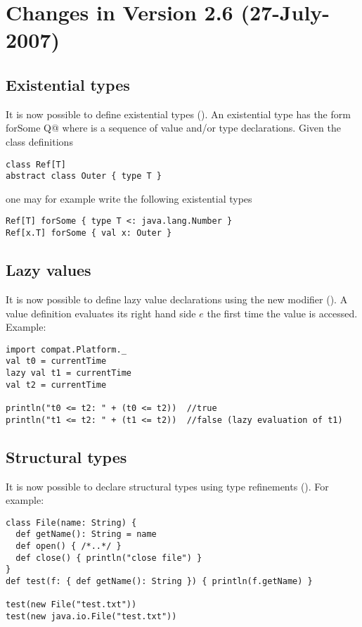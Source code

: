 \section*{Changes in Version 2.6 (27-July-2007)}

\subsection*{Existential types}

It is now possible to define existential types
().
An existential type has the form \lstinline@T forSome {Q}@ where
\lstinline@Q@ 
is a sequence of value and/or type declarations. Given the class definitions
\begin{lstlisting}
class Ref[T]
abstract class Outer { type T }
\end{lstlisting}
one may for example write the following existential types
\begin{lstlisting}
Ref[T] forSome { type T <: java.lang.Number }
Ref[x.T] forSome { val x: Outer }
\end{lstlisting}

\subsection*{Lazy values}

It is now possible to define lazy value declarations
using the new modifier \lstinline@lazy@ ().
A \lstinline@lazy@ value definition evaluates
its right hand side $e$ the first time the value is accessed.
Example:
\begin{lstlisting}
import compat.Platform._
val t0 = currentTime
lazy val t1 = currentTime
val t2 = currentTime

println("t0 <= t2: " + (t0 <= t2))  //true
println("t1 <= t2: " + (t1 <= t2))  //false (lazy evaluation of t1)
\end{lstlisting}

\subsection*{Structural types}

It is now possible to declare structural types using type
refinements (). For example:
\begin{lstlisting}
class File(name: String) {
  def getName(): String = name
  def open() { /*..*/ }
  def close() { println("close file") }
}
def test(f: { def getName(): String }) { println(f.getName) }

test(new File("test.txt"))
test(new java.io.File("test.txt"))
\end{lstlisting}


